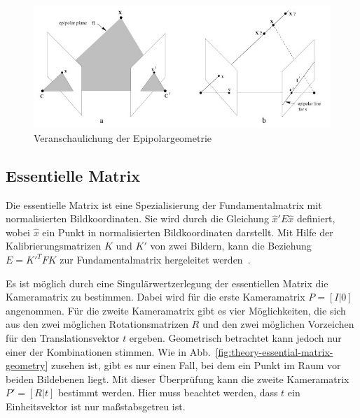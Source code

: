 \begin{figure}[h!]
    \centering
    \includegraphics[width=\textwidth]{src/img/hartley_2003_fundamental_matrix.jpg}
    \caption{Veranschaulichung der Epipolargeometrie~\cite[Fig. 9.1]{hartley_2003}}
    \label{fig:theory-fundamental-matrix}
\end{figure}

\subsection{Essentielle Matrix}
Die essentielle Matrix ist eine Spezialisierung der Fundamentalmatrix mit normalisierten Bildkoordinaten.
Sie wird durch die Gleichung $\hat{x}'E\hat{x}$ definiert, wobei $\hat{x}$ ein Punkt in normalisierten Bildkoordinaten darstellt.
Mit Hilfe der Kalibrierungsmatrizen $K$ und $K'$ von zwei Bildern, kann die Beziehung $E=K'^TFK$ zur Fundamentalmatrix hergeleitet werden~\cite[Kaptiel 9.6]{hartley_2003}.

Es ist möglich durch eine Singulärwertzerlegung der essentiellen Matrix die Kameramatrix zu bestimmen.
Dabei wird für die erste Kameramatrix $P=[I|0]$ angenommen. 
Für die zweite Kameramatrix gibt es vier Möglichkeiten, die sich aus den zwei möglichen Rotationsmatrizen $R$ und den zwei möglichen Vorzeichen für den Translationsvektor $t$ ergeben.
Geometrisch betrachtet kann jedoch nur einer der Kombinationen stimmen.
Wie in Abb.~\ref{fig:theory-essential-matrix-geometry} zusehen ist, gibt es nur einen Fall, bei dem ein Punkt im Raum vor beiden Bildebenen liegt.
Mit dieser Überprüfung kann die zweite Kameramatrix $P'=[R|t]$ bestimmt werden.
Hier muss beachtet werden, dass $t$ ein Einheitsvektor ist nur maßstabsgetreu ist.


